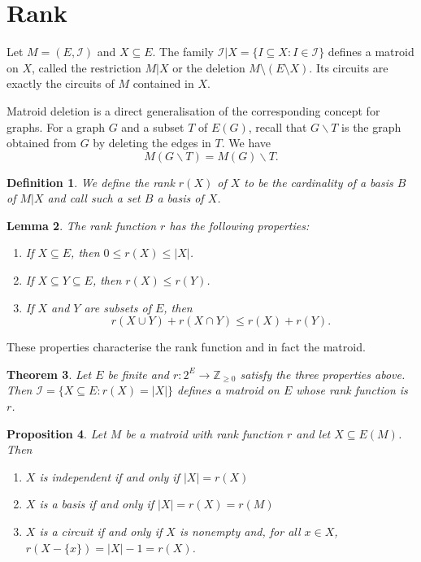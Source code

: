 \documentclass[11pt,letterpaper]{article}
\newcommand{\I}{\mathcal{I}}
\theoremstyle{appendix-result}
\newtheorem{theorem}{Theorem}[section]
\newtheorem{lemma}[theorem]{Lemma}
\newtheorem{proposition}[theorem]{Proposition}
\theoremstyle{appendix-definition}
\newtheorem{definition}[theorem]{Definition}
\begin{document}
\section{Rank}
Let $M=(E,\I)$ and $X\subseteq E$. The family $\I|X=\{I\subseteq X:I\in\I\}$ defines a matroid on $X$, called the restriction $M|X$ or the deletion $M\setminus(E\setminus X)$. Its circuits are exactly the circuits of $M$ contained in $X$.
\par Matroid deletion is a direct generalisation of the corresponding concept for graphs. For a graph $G$ and a subset $T$ of $E(G)$, recall that $G \backslash T$ is the graph obtained from $G$ by deleting the edges in $T$. We have
\[M(G \backslash T) = M(G) \backslash T.\]
\begin{definition}
    We define the rank $r(X)$ of $X$ to be the cardinality of a basis $B$ of $M \vert X$ and call such a set $B$ a basis of $X$.
\end{definition}
\begin{lemma}
    The rank function $r$ has the following properties:
    \begin{enumerate}
        \item If $X \subseteq E$, then $0 \le r(X) \le |X|$.
        \item If $X \subseteq Y \subseteq E$, then $r(X) \le r(Y)$.
        \item If $X$ and $Y$ are subsets of $E$, then
        \[r(X \cup Y)+r(X \cap Y) \le r(X)+r(Y).\]
    \end{enumerate}
\end{lemma}
These properties characterise the rank function and in fact the matroid.
\begin{theorem}
    Let $E$ be finite and $r\colon 2^E \to \mathbb{Z}_{\geq 0}$ satisfy the three properties above. Then $\I=\{X\subseteq E:r(X)=|X|\}$ defines a matroid on $E$ whose rank function is $r$.
\end{theorem}
\begin{proposition}
    Let $M$ be a matroid with rank function $r$ and let $X \subseteq E(M)$. Then
    \begin{enumerate}
        \item $X$ is independent if and only if $|X|=r(X)$
        \item $X$ is a basis if and only if $|X|=r(X)=r(M)$
        \item $X$ is a circuit if and only if $X$ is nonempty and, for all $x \in X$, $r(X-\{x\}) = |X|-1=r(X)$.
    \end{enumerate}
\end{proposition}
\end{document}
